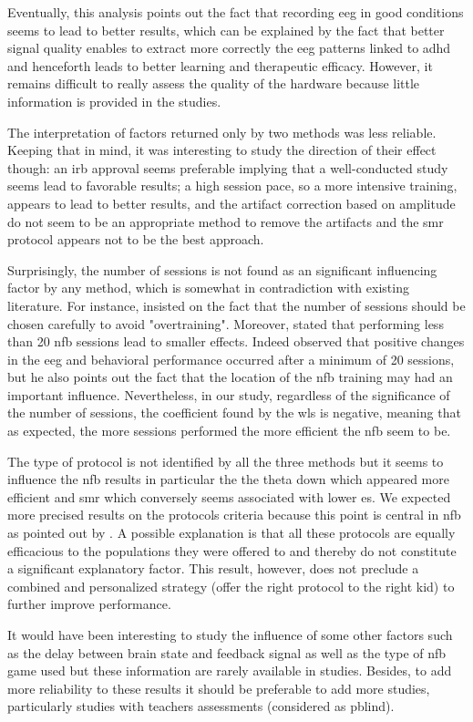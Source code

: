 Eventually, this analysis points out the fact that recording \gls{eeg} in good conditions seems to lead to better results, 
which can be explained by the fact that better signal quality enables to extract more correctly the \gls{eeg} 
patterns linked to \gls{adhd} and henceforth leads to better learning and therapeutic efficacy. However, it remains difficult to 
really assess the quality of the hardware because little information is provided in the studies.  

The interpretation of factors returned only by two methods was less reliable. Keeping that in mind, it was interesting 
to study the direction of their effect though: an \gls{irb} approval seems preferable implying that a well-conducted study 
seems lead to favorable results; a high session pace, so a more intensive training, appears to lead to better results,
and the artifact correction based on amplitude do not seem to be an appropriate method to remove the artifacts and the \gls{smr} protocol
appears not to be the best approach. 

Surprisingly, the number of sessions is not found as an significant influencing factor by any method, 
which is somewhat in contradiction with existing literature.
For instance, \citet{Enriquez2017} insisted on the fact that the number of sessions should be 
chosen carefully to avoid "overtraining". Moreover, \citet{Arns2014} stated that performing less than 20 \gls{nfb} sessions 
lead to smaller effects. Indeed \citet{Vernon2004} observed that positive changes in the \gls{eeg} and behavioral 
performance occurred after a minimum of 20 sessions, but he also points out the fact that the
location of the \gls{nfb} training may had an important influence. 
Nevertheless, in our study, regardless of the significance of the number of sessions, the coefficient 
found by the \gls{wls} is negative, meaning that as expected,
the more sessions performed the more efficient the \gls{nfb} seem to be. 

The type of protocol is not identified by all the three methods but it seems to influence the \gls{nfb} results in particular the the theta down 
which appeared more efficient and \gls{smr} which conversely seems associated with lower \gls{es}. We expected 
more precised results on the protocols criteria because this point is central in \gls{nfb} as pointed out by \citet{Vernon2004}.
A possible explanation is that all these protocols are equally efficacious to the populations they were offered to and 
thereby do not constitute a significant explanatory factor. This result, however,
does not preclude a combined and personalized strategy (offer the right protocol to the right kid) to 
further improve performance. 

It would have been interesting to study the influence of some other factors such as the delay between brain state and feedback signal as well as the type of \gls{nfb} game used 
but these information are rarely available in studies. Besides, to add more reliability to these results it should be preferable to add more studies, 
particularly studies with teachers assessments (considered as \gls{pblind}). 


